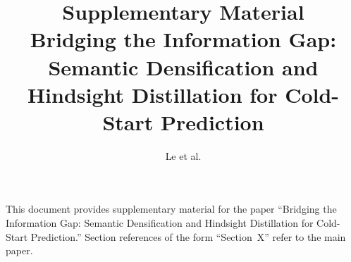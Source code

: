 \documentclass[sigconf, nonacm]{acmart}
\title{Supplementary Material\\\large Bridging the Information Gap: Semantic Densification and Hindsight Distillation for Cold-Start Prediction}
\author{Le et al.}
\affiliation{\institution{}\country{}}
\begin{document}
\maketitle

\noindent This document provides supplementary material for the paper
``Bridging the Information Gap: Semantic Densification and Hindsight
Distillation for Cold-Start Prediction.'' Section references of the form
``Section~X'' refer to the main paper.

\renewcommand{\thesection}{S\arabic{section}}
\setcounter{section}{0}





\end{document}
